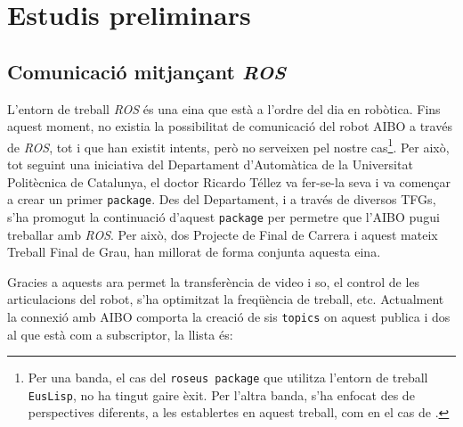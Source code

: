 \documentclass[12pt,a4paper,final,twoside]{article}
\begin{document}
\newpage

\section{Estudis preliminars}
\label{Estudis-preliminars}


\subsection{Comunicació mitjançant \textit{ROS}}
\label{ROS-estudi-pre}

L'entorn de treball \textit{ROS} és una eina que està a l'ordre del dia en robòtica. Fins aquest moment, no existia la possibilitat de comunicació del robot AIBO a través de \textit{ROS}, tot i que han existit intents, però no serveixen pel nostre cas\footnote{Per una banda, el cas del \texttt{roseus package} \cite{Okada} que utilitza l'entorn de treball \texttt{EusLisp}, no ha tingut gaire èxit. Per l'altra banda, s'ha enfocat des de perspectives diferents, a les establertes en aquest treball, com en el cas de \cite{Rofer2013}.}. Per això, tot seguint una iniciativa del Departament d'Automàtica de la Universitat Politècnica de Catalunya, el doctor Ricardo Téllez va fer-se-la seva i va començar a crear un primer \texttt{package}. Des del Departament, i a través de diversos TFGs, s'ha promogut la continuació d'aquest \texttt{package} per permetre que l'AIBO pugui treballar amb \textit{ROS}. Per això, dos Projecte de Final de Carrera i aquest mateix Treball Final de Grau, han millorat de forma conjunta aquesta eina. 

Gracies a aquests ara permet la transferència de video i so, el control de les articulacions del robot, s'ha optimitzat la freqüència de treball, etc. Actualment la connexió amb AIBO comporta la creació de sis \texttt{topics} on aquest publica i dos al que està com a subscriptor, la llista és:
\end{document}
